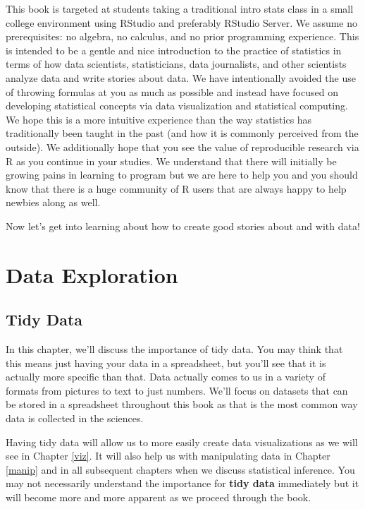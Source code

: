 \documentclass[]{tufte-book}
\begin{document}
This book is targeted at students taking a traditional intro stats class
in a small college environment using RStudio and preferably RStudio
Server. We assume no prerequisites: no algebra, no calculus, and no
prior programming experience. This is intended to be a gentle and nice
introduction to the practice of statistics in terms of how data
scientists, statisticians, data journalists, and other scientists
analyze data and write stories about data. We have intentionally avoided
the use of throwing formulas at you as much as possible and instead have
focused on developing statistical concepts via data visualization and
statistical computing. We hope this is a more intuitive experience than
the way statistics has traditionally been taught in the past (and how it
is commonly perceived from the outside). We additionally hope that you
see the value of reproducible research via R as you continue in your
studies. We understand that there will initially be growing pains in
learning to program but we are here to help you and you should know that
there is a huge community of R users that are always happy to help
newbies along as well.

Now let's get into learning about how to create good stories about and
with data!

\part{Data Exploration}\label{part-data-exploration}

\chapter{Tidy Data}\label{tidy}

In this chapter, we'll discuss the importance of tidy data. You may
think that this means just having your data in a spreadsheet, but you'll
see that it is actually more specific than that. Data actually comes to
us in a variety of formats from pictures to text to just numbers. We'll
focus on datasets that can be stored in a spreadsheet throughout this
book as that is the most common way data is collected in the sciences.

Having tidy data will allow us to more easily create data visualizations
as we will see in Chapter \ref{viz}. It will also help us with
manipulating data in Chapter \ref{manip} and in all subsequent chapters
when we discuss statistical inference. You may not necessarily
understand the importance for \textbf{tidy data} immediately but it will
become more and more apparent as we proceed through the book.
\end{document}

